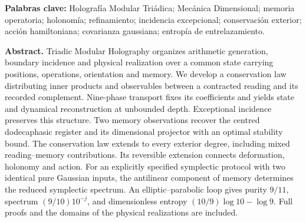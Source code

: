 \medskip
\noindent\textbf{Palabras clave:} Holografía Modular Triádica; Mecánica Dimensional; memoria operatoria; holonomía; refinamiento; incidencia excepcional; conservación exterior; acción hamiltoniana; covarianza gaussiana; entropía de entrelazamiento.

\clearpage
\noindent\textbf{Abstract.}
Triadic Modular Holography organizes arithmetic generation, boundary incidence and physical realization over a common state carrying positions, operations, orientation and memory. We develop a conservation law distributing inner products and observables between a contracted reading and its recorded complement. Nine-phase transport fixes its coefficients and yields state and dynamical reconstruction at unbounded depth. Exceptional incidence preserves this structure. Two memory observations recover the centred dodecaphasic register and its dimensional projector with an optimal stability bound. The conservation law extends to every exterior degree, including mixed reading--memory contributions. Its reversible extension connects deformation, holonomy and action. For an explicitly specified symplectic protocol with two identical pure Gaussian inputs, the antilinear component of memory determines the reduced symplectic spectrum. An elliptic--parabolic loop gives purity \(9/11\), spectrum \((9/10)10^{-j}\), and dimensionless entropy \((10/9)\log10-\log9\). Full proofs and the domains of the physical realizations are included.
